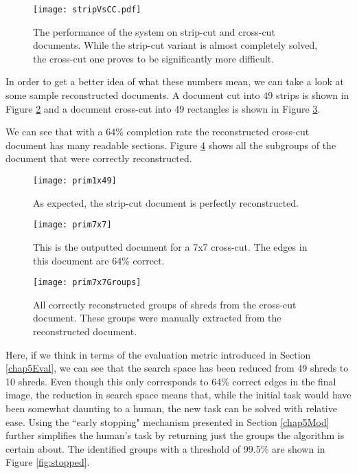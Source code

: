 \begin{figure}[h]
    \centering
    \texttt{[image: stripVsCC.pdf]}
    \caption{The performance of the system on strip-cut and cross-cut documents. While the strip-cut variant is almost completely solved, the cross-cut one proves to be significantly more difficult.}
    \label{fig:rez}
\end{figure}

In order to get a better idea of what these numbers mean, we can take a look at some sample reconstructed documents. A document cut into 49 strips is shown in Figure \ref{fig:strip} and a document cross-cut into 49 rectangles is shown in Figure \ref{fig:cross}.

We can see that with a 64\% completion rate the reconstructed cross-cut document has many readable sections. Figure \ref{fig:crossGroups} shows all the subgroups of the document that were correctly reconstructed.

\begin{figure}[H]
    \centering
    \texttt{[image: prim1x49]}
    \caption{As expected, the strip-cut document is perfectly reconstructed.}
    \label{fig:strip}
\end{figure}

\begin{figure}[H]
    \centering
    \texttt{[image: prim7x7]}
    \caption{This is the outputted document for a 7x7 cross-cut. The edges in this document are 64\% correct.}
    \label{fig:cross}
\end{figure}

\begin{figure}[H]
    \centering
    \texttt{[image: prim7x7Groups]}
    \caption{All correctly reconstructed groups of shreds from the cross-cut document. These groups were manually extracted from the reconstructed document.}
    \label{fig:crossGroups}
\end{figure}

Here, if we think in terms of the evaluation metric introduced in Section \ref{chap5Eval}, we can see that the search space has been reduced from 49 shreds to 10 shreds. Even though this only corresponds to 64\% correct edges in the final image, the reduction in search space means that, while the initial task would have been somewhat daunting to a human, the new task can be solved with relative ease. Using the ``early stopping" mechanism presented in Section \ref{chap5Mod} further simplifies the human's task by returning just the groups the algorithm is certain about. The identified groups with a threshold of 99.5\% are shown in Figure \ref{fig:stopped}.


